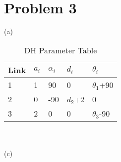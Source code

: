 \documentclass[twoside,11pt]{homework}
\begin{document}
\section*{Problem 3}
(a)\\
%
\begin{table}[h!] \centering
\caption{DH Parameter Table}
\begin{tabular}{|l|l|l|l|l|}
\hline
Link & $a_i$ & \textbf{$\alpha_i$} & $d_i$   & $\theta_i$ \\ \hline
1             & 1             & 90                 & 0      & $\theta_1$+90 \\ \hline
2             & 0             & -90                & $d_2$+2 & 0       \\ \hline
3             & 2             & 0                 & 0   & $\theta_3$-90        \\ \hline
\end{tabular}
\end{table}
%
\\\\
(c)\\
\end{document}
